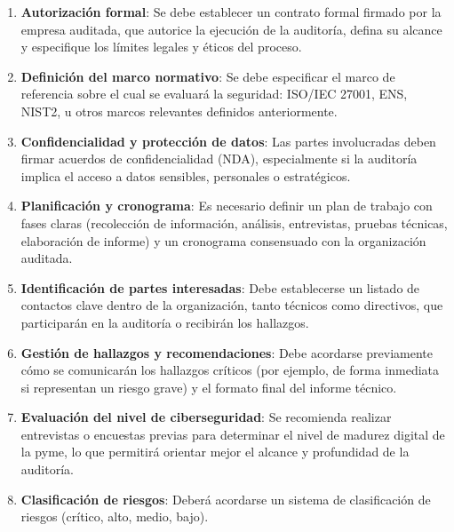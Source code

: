 \documentclass[a4paper, 10pt]{article}
\begin{document}
\begin{enumerate}
    \item \textbf{Autorización formal}: Se debe establecer un contrato formal firmado por la empresa auditada, que autorice la ejecución de la auditoría, defina su alcance y especifique los límites legales y éticos del proceso.

    \item \textbf{Definición del marco normativo}: Se debe especificar el marco de referencia sobre el cual se evaluará la seguridad: ISO/IEC 27001, ENS, NIST2, u otros marcos relevantes definidos anteriormente.

    \item \textbf{Confidencialidad y protección de datos}: Las partes involucradas deben firmar acuerdos de confidencialidad (NDA), especialmente si la auditoría implica el acceso a datos sensibles, personales o estratégicos.

    \item \textbf{Planificación y cronograma}: Es necesario definir un plan de trabajo con fases claras (recolección de información, análisis, entrevistas, pruebas técnicas, elaboración de informe) y un cronograma consensuado con la organización auditada.

    \item \textbf{Identificación de partes interesadas}: Debe establecerse un listado de contactos clave dentro de la organización, tanto técnicos como directivos, que participarán en la auditoría o recibirán los hallazgos.




    \item \textbf{Gestión de hallazgos y recomendaciones}: Debe acordarse previamente cómo se comunicarán los hallazgos críticos (por ejemplo, de forma inmediata si representan un riesgo grave) y el formato final del informe técnico.


    \item \textbf{Evaluación del nivel de ciberseguridad}: Se recomienda realizar entrevistas o encuestas previas para determinar el nivel de madurez digital de la pyme, lo que permitirá orientar mejor el alcance y profundidad de la auditoría.


    \item \textbf{Clasificación de riesgos}: Deberá acordarse un sistema de clasificación de riesgos (crítico, alto, medio, bajo).
\end{enumerate}
\end{document}

